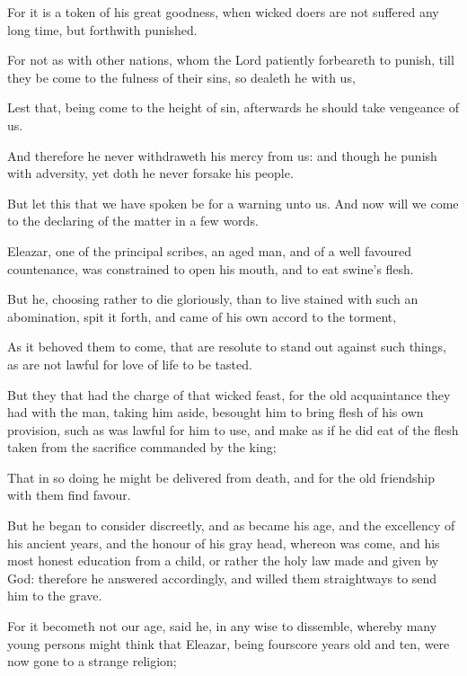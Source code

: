 {\par }{\PP {}For it is a token of his great goodness, when wicked doers are not suffered any long time, but forthwith punished.
\par }{\PP {}For not as with other nations, whom the Lord patiently forbeareth to punish, till they be come to the fulness of their sins, so dealeth he with us,
\par }{\PP {}Lest that, being come to the height of sin, afterwards he should take vengeance of us.
\par }{\PP {}And therefore he never withdraweth his mercy from us: and though he punish with adversity, yet doth he never forsake his people.
\par }{\PP {}But let this that we have spoken be for a warning unto us. And now will we come to the declaring of the matter in a few words.
\par }{\PP {}Eleazar, one of the principal scribes, an aged man, and of a well favoured countenance, was constrained to open his mouth, and to eat swine’s flesh.
\par }{\PP {}But he, choosing rather to die gloriously, than to live stained with such an abomination, spit it forth, and came of his own accord to the torment,
\par }{\PP {}As it behoved them to come, that are resolute to stand out against such things, as are not lawful for love of life to be tasted.
\par }{\PP {}But they that had the charge of that wicked feast, for the old acquaintance they had with the man, taking him aside, besought him to bring flesh of his own provision, such as was lawful for him to use, and make as if he did eat of the flesh taken from the sacrifice commanded by the king;
\par }{\PP {}That in so doing he might be delivered from death, and for the old friendship with them find favour.
\par }{\PP {}But he began to consider discreetly, and as became his age, and the excellency of his ancient years, and the honour of his gray head, whereon was come, and his most honest education from a child, or rather the holy law made and given by God: therefore he answered accordingly, and willed them straightways to send him to the grave.
\par }{\PP {}For it becometh not our age, said he, in any wise to dissemble, whereby many young persons might think that Eleazar, being fourscore years old and ten, were now gone to a strange religion;
}
